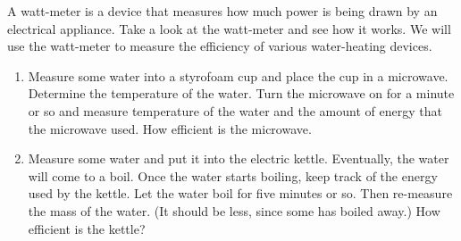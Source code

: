 \documentclass[12pt]{article}
\begin{document}
\noindent A watt-meter is a device that measures how much power is
being drawn by an electrical appliance.  Take a look at the watt-meter
and see how it works.  We will use the watt-meter to measure the
efficiency of various water-heating devices.
\begin{enumerate}
  \item Measure some water into a styrofoam cup and place the cup in a
  microwave.  Determine the temperature of the water.  Turn the
  microwave on for a minute or so and measure temperature of the water
  and the amount of energy that the microwave used.  How efficient is
  the microwave.

  \item Measure some water and put it into the electric kettle.
  Eventually, the water will come to a boil.  Once the water starts
  boiling, keep track of the energy used by the kettle.  Let the water
  boil for five minutes or so.  Then re-measure the mass of the
  water. (It should be less, since some has boiled away.)  How
  efficient is the kettle?
\end{enumerate}
\end{document}
